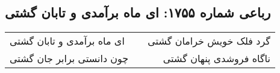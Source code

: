 \begin{center}
\section*{رباعی شماره ۱۷۵۵: ای ماه برآمدی و تابان گشتی}
\label{sec:1755}
\begin{longtable}{l p{0.5cm} r}
ای ماه برآمدی و تابان گشتی
&&
گرد فلک خویش خرامان گشتی
\\
چون دانستی برابر جان گشتی
&&
ناگاه فروشدی پنهان گشتی
\\
\end{longtable}
\end{center}
